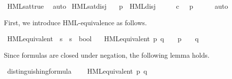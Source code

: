 \begin{isabellebody}
\isamarkupfalse%
\ HML{\isacharunderscore}{\kern0pt}sat{\isacharunderscore}{\kern0pt}true\ \isamarkupfalse%
\ auto%
\endisatagproof
{\isafoldproof}%
%
\isadelimproof
\isanewline
%
\endisadelimproof
{}\isamarkupfalse%
\ HML{\isacharunderscore}{\kern0pt}sat{\isacharunderscore}{\kern0pt}disj{\isacharcolon}{\kern0pt}\isanewline
\ \ \ {\isacartoucheopen}{\isacharparenleft}{\kern0pt}p\ {\isasymTurnstile}\ HML{\isacharunderscore}{\kern0pt}disj\ {\isasymPhi}{\isacharparenright}{\kern0pt}\ {\isacharequal}{\kern0pt}\ {\isacharparenleft}{\kern0pt}{\isasymexists}\ {\isasymphi}{\isachardot}{\kern0pt}\ {\isasymphi}\ {\isasymin}\isactrlsub c\ {\isasymPhi}\ {\isasymand}\ p\ {\isasymTurnstile}\ {\isasymphi}{\isacharparenright}{\kern0pt}{\isacartoucheclose}\isanewline
%
\isadelimproof
\ \ %
\endisadelimproof
%
\isatagproof
{}\isamarkupfalse%
\ auto%
\endisatagproof
{\isafoldproof}%
%
\isadelimproof
%
\endisadelimproof
%
\isadelimdocument
%
\endisadelimdocument
%
\isatagdocument
%
\isamarkuptrue%
%
\endisatagdocument
{\isafolddocument}%
%
\isadelimdocument
%
\endisadelimdocument
%
\begin{isamarkuptext}%
First, we introduce HML-equivalence as follows.%
\end{isamarkuptext}\isamarkuptrue%
\isamarkupfalse%
\ HML{\isacharunderscore}{\kern0pt}equivalent\ {\isacharcolon}{\kern0pt}{\isacharcolon}{\kern0pt}\ {\isacartoucheopen}{\isacharprime}{\kern0pt}s\ {\isasymRightarrow}\ {\isacharprime}{\kern0pt}s\ {\isasymRightarrow}\ bool{\isacartoucheclose}\isanewline
\ \ \ {\isacartoucheopen}HML{\isacharunderscore}{\kern0pt}equivalent\ p\ q\ {\isasymequiv}\ {\isacharparenleft}{\kern0pt}{\isasymforall}\ {\isasymphi}{\isachardot}{\kern0pt}\ {\isacharparenleft}{\kern0pt}p\ {\isasymTurnstile}\ {\isasymphi}{\isacharparenright}{\kern0pt}\ {\isasymlongleftrightarrow}\ {\isacharparenleft}{\kern0pt}q\ {\isasymTurnstile}\ {\isasymphi}{\isacharparenright}{\kern0pt}{\isacharparenright}{\kern0pt}{\isacartoucheclose}%
\begin{isamarkuptext}%
Since formulas are closed under negation, the following lemma holds.%
\end{isamarkuptext}\isamarkuptrue%
\isamarkupfalse%
\ distinguishing{\isacharunderscore}{\kern0pt}formula{\isacharcolon}{\kern0pt}\isanewline
\ \ \ {\isacartoucheopen}{\isasymnot}\ HML{\isacharunderscore}{\kern0pt}equivalent\ p\ q{\isacartoucheclose}\isanewline

\end{isabellebody}
